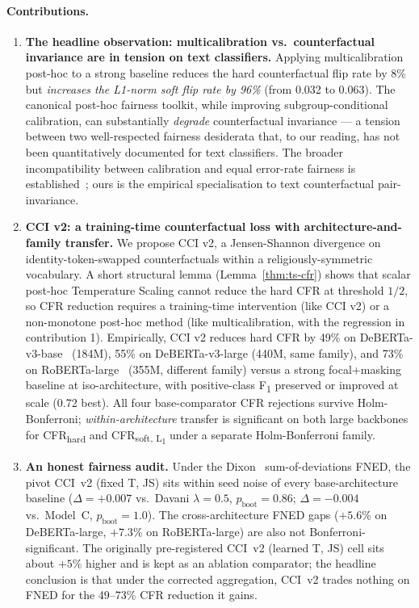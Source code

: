 \paragraph{Contributions.}
\begin{enumerate}[leftmargin=*,itemsep=2pt]
    \item \textbf{The headline observation: multicalibration vs.\ counterfactual invariance are in tension on text classifiers.} Applying multicalibration~\citep{hebertjohnson2018multicalibration} post-hoc to a strong baseline reduces the hard counterfactual flip rate by 8\% but \emph{increases the L1-norm soft flip rate by 96\%} (from 0.032 to 0.063). The canonical post-hoc fairness toolkit, while improving subgroup-conditional calibration, can substantially \emph{degrade} counterfactual invariance --- a tension between two well-respected fairness desiderata that, to our reading, has not been quantitatively documented for text classifiers. The broader incompatibility between calibration and equal error-rate fairness is established~\citep{pleiss2017fairness}; ours is the empirical specialisation to text counterfactual pair-invariance.
    \item \textbf{CCI v2: a training-time counterfactual loss with architecture-and-family transfer.} We propose CCI v2, a Jensen-Shannon divergence on identity-token-swapped counterfactuals within a religiously-symmetric vocabulary. A short structural lemma (Lemma~\ref{thm:ts-cfr}) shows that scalar post-hoc Temperature Scaling cannot reduce the hard CFR at threshold $1/2$, so CFR reduction requires a training-time intervention (like CCI v2) or a non-monotone post-hoc method (like multicalibration, with the regression in contribution 1). Empirically, CCI v2 reduces hard CFR by 49\% on DeBERTa-v3-base~\citep{he2023debertav3} (184M), 55\% on DeBERTa-v3-large (440M, same family), and 73\% on RoBERTa-large~\citep{liu2019roberta} (355M, different family) versus a strong focal+masking baseline at iso-architecture, with positive-class F\textsubscript{1} preserved or improved at scale (0.72 best). All four base-comparator CFR rejections survive Holm-Bonferroni; \emph{within-architecture} transfer is significant on both large backbones for CFR\textsubscript{hard} and CFR\textsubscript{soft, L\textsubscript{1}} under a separate Holm-Bonferroni family.
    \item \textbf{An honest fairness audit.} Under the Dixon~\citep{dixon2018measuring} sum-of-deviations FNED, the pivot CCI~v2 (fixed T, JS) sits within seed noise of every base-architecture baseline ($\Delta = +0.007$ vs.\ Davani $\lambda=0.5$, $p_{\text{boot}} = 0.86$; $\Delta = -0.004$ vs.\ Model~C, $p_{\text{boot}} = 1.0$). The cross-architecture FNED gaps ($+5.6\%$ on DeBERTa-large, $+7.3\%$ on RoBERTa-large) are also not Bonferroni-significant. The originally pre-registered CCI~v2 (learned T, JS) cell sits about $+5\%$ higher and is kept as an ablation comparator; the headline conclusion is that under the corrected aggregation, CCI~v2 trades nothing on FNED for the 49--73\% CFR reduction it gains.

\end{enumerate}
